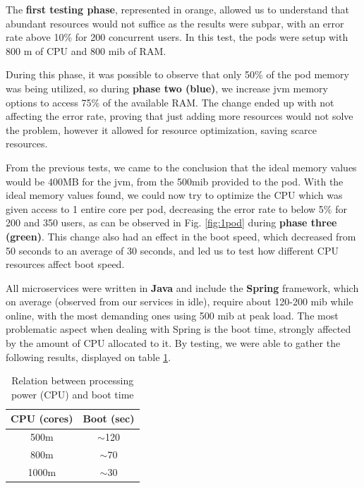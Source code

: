 The \textbf{first testing phase}, represented in orange, allowed us to understand that abundant resources would not suffice as the results were subpar, with an error rate above 10\% for 200 concurrent users. In this test, the pods were setup with 800 \acrfull{m} of CPU and 800 \acrfull{mib} of RAM.

During this phase, it was possible to observe that only 50\% of the pod memory was being utilized, so during \textbf{phase two (blue)}, we increase \acrshort{jvm} memory options to access 75\% of the available RAM. The change ended up with not affecting the error rate, proving that just adding more resources would not solve the problem, however it allowed for resource optimization, saving scarce resources.

From the previous tests, we came to the conclusion that the ideal memory values would be 400MB for the \acrshort{jvm}, from the 500\acrshort{mib} provided to the pod. With the ideal memory values found, we could now try to optimize the CPU which was given access to 1 entire core per pod, decreasing the error rate to below 5\% for 200 and 350 users, as can be observed in Fig. \ref{fig:1pod} during \textbf{phase three (green)}. This change also had an effect in the boot speed, which decreased from 50 seconds to an average of 30 seconds, and led us to test how different CPU resources affect boot speed.

All microservices were written in \textbf{Java} and include the \textbf{Spring} framework, which on average (observed from our services in idle), require about 120-200 \acrfull{mib} while online, with the most demanding ones using 500 \acrshort{mib} at peak load. The most problematic aspect when dealing with Spring is the boot time, strongly affected by the amount of CPU allocated to it. By testing, we were able to gather the following results, displayed on table \ref{tbl:cpuBoot}.

\begin{table}[!h]
    \centering
    \begin{tabular}{c|c}
    CPU (cores) & Boot (sec)  \\ \hline
    500m        & $\sim$120 \\
    800m        & $\sim$70  \\
    1000m       & $\sim$30 
    \end{tabular}
    
    \caption{Relation between processing power (CPU) and boot time}
    \label{tbl:cpuBoot}
\end{table}

